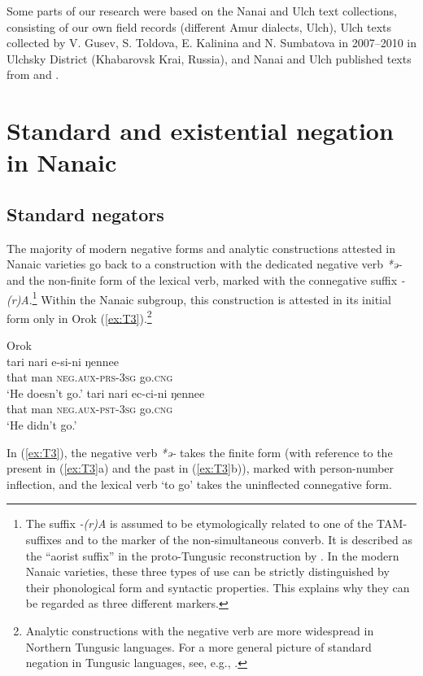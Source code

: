\documentclass[output=paper]{langscibook}
\begin{document}
Some parts of our research were based on the Nanai and Ulch text collections, consisting of our own field records (different Amur dialects, Ulch), Ulch texts collected by V. Gusev, S. Toldova, E. Kalinina and N. Sumbatova in 2007–2010 in Ulchsky District (Khabarovsk Krai, Russia), and Nanai and Ulch published texts from \citet{avrorin1986a} and \citet{sunik1985a}.

\section{Standard and existential negation in Nanaic}\label{sec:T4}
\subsection{Standard negators}\label{sec:T4.1}

The majority of modern negative forms and analytic constructions attested in Nanaic varieties go back to a construction with the dedicated negative verb \textit{*ə-} and the non-finite form of the lexical verb, marked with the connegative suffix \textit{-(r)A}.\footnote{\label{footnote:4}The suffix \textit{-(r)A} is assumed to be etymologically related to one of the TAM-suffixes and to the marker of the non-simultaneous converb. It is described as the “aorist suffix” in the proto-Tungusic reconstruction by \citet[124 ff., 146]{benzing1955a}. In the modern Nanaic varieties, these three types of use can be strictly distinguished by their phonological form and syntactic properties. This explains why they can be regarded as three different markers.} Within the Nanaic subgroup, this construction is attested in its initial form only in Orok (\ref{ex:T3}).\footnote{Analytic constructions with the negative verb are more widespread in Northern Tungusic languages. For a more general picture of standard negation in Tungusic languages, see, e.g., \citet{hoelzl2015a}.}

\ea Orok \label{ex:T3}\\
  \ea
	\gll tari	nari	e-si-ni	ŋennee\\
	that	man	\textsc{neg.aux-prs-3sg}	go.\textsc{cng}\\
    \glt `He doesn’t go.' \citep[13]{tsumagari2009a}
  \ex
	\gll tari	nari	ec-ci-ni	ŋennee\\
	that	man	\textsc{neg.aux-pst-3sg}	go.\textsc{cng}\\
	\glt `He didn’t go.' \citep[13]{tsumagari2009a}
\z \z

In (\ref{ex:T3}), the negative verb \textit{*ə-} takes the finite form (with reference to the present in (\ref{ex:T3}a) and the past in (\ref{ex:T3}b)), marked with person-number inflection, and the lexical verb ‘to go’ takes the uninflected connegative form.
\end{document}
